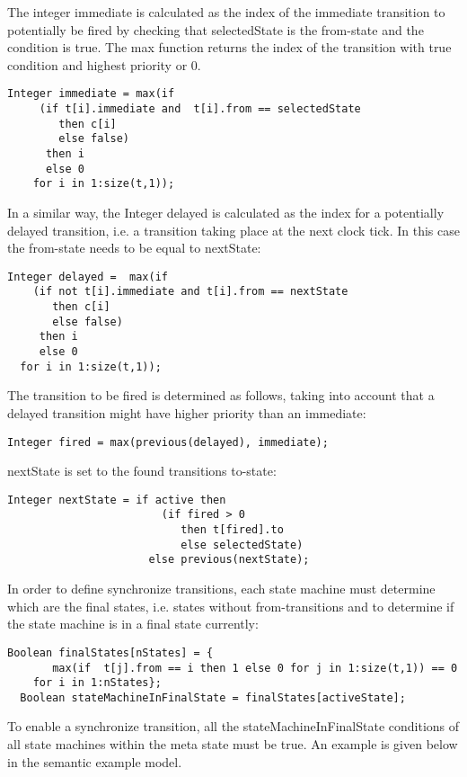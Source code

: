 The integer immediate is calculated as the index of the immediate
transition to potentially be fired by checking that selectedState is the
from-state and the condition is true. The max function returns the index
of the transition with true condition and highest priority or 0.

\begin{lstlisting}[language=modelica]
  Integer immediate = max(if
     (if t[i].immediate and  t[i].from == selectedState
        then c[i]
		else false)
	  then i
	  else 0
	for i in 1:size(t,1));
\end{lstlisting}
In a similar way, the Integer delayed is calculated as the index for a
potentially delayed transition, i.e. a transition taking place at the
next clock tick. In this case the from-state needs to be equal to
nextState:

\begin{lstlisting}[language=modelica]
  Integer delayed =  max(if
    (if not t[i].immediate and t[i].from == nextState
	   then c[i]
	   else false)
	 then i
	 else 0
  for i in 1:size(t,1));
\end{lstlisting}
The transition to be fired is determined as follows, taking into account
that a delayed transition might have higher priority than an immediate:

\begin{lstlisting}[language=modelica]
  Integer fired = max(previous(delayed), immediate);
\end{lstlisting}
nextState is set to the found transitions to-state:

\begin{lstlisting}[language=modelica]
  Integer nextState = if active then
                        (if fired > 0
						   then t[fired].to
						   else selectedState)
					  else previous(nextState);
\end{lstlisting}
In order to define synchronize transitions, each state machine must
determine which are the final states, i.e. states without
from-transitions and to determine if the state machine is in a final
state currently:

\begin{lstlisting}[language=modelica]
  Boolean finalStates[nStates] = {
       max(if  t[j].from == i then 1 else 0 for j in 1:size(t,1)) == 0
	for i in 1:nStates};
  Boolean stateMachineInFinalState = finalStates[activeState];
\end{lstlisting}
To enable a synchronize transition, all the stateMachineInFinalState
conditions of all state machines within the meta state must be true. An
example is given below in the semantic example model.

